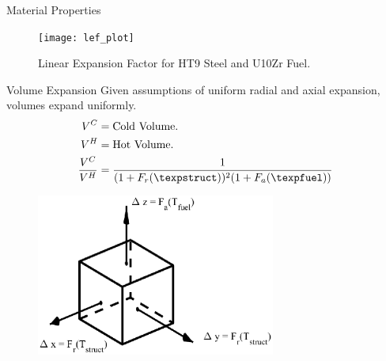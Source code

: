 \begin{frame}{Material Properties}
  \begin{figure}
    \centering
    \texttt{[image: lef\_plot]}
    \caption{Linear Expansion Factor for HT9 Steel and U10Zr Fuel.}
    \label{fig:lef_plot}
  \end{figure}
\end{frame}

\begin{frame}{Volume Expansion}
  Given assumptions of uniform radial and axial expansion, volumes expand
  uniformly.
  \begin{align}
    \label{eq:volume_ratio}
    V^C &= \text{Cold Volume.}\\
    V^H &= \text{Hot Volume.}\\
    \frac{V^C}{V^H} &= \frac{1}{(1+F_r(\texpstruct))^2 (1+F_a(\texpfuel))}
  \end{align}

  \begin{figure}
    \centering
    \includegraphics[width=0.7\textwidth]{./figs/thexp_figure}
    \label{fig:thexp_figure}
  \end{figure}
\end{frame}

